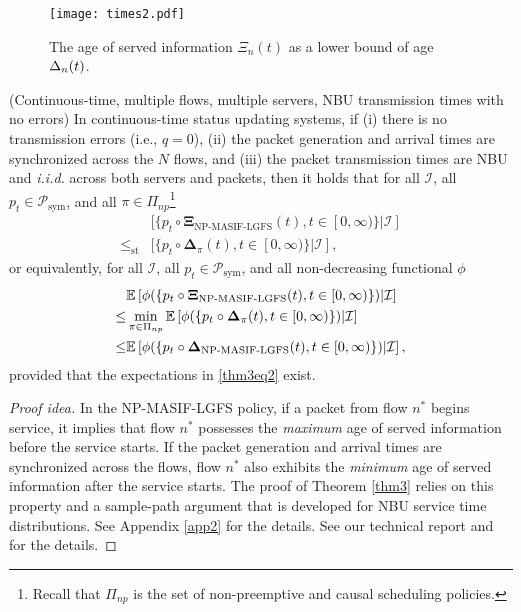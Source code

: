\begin{figure}
\centering 
\texttt{[image: times2.pdf]} \caption{The age of served information $\Xi_{n} (t)$ as a lower bound of  age $\Delta_{n}(t)$.}
\vspace{-5mm}
\label{fig_times2} 
\end{figure} 

\begin{theorem}(Continuous-time, multiple flows, multiple servers, NBU transmission times with no errors) \label{thm3}
In continuous-time status updating systems, if  (i) there is no  transmission errors (i.e., $q=0$),  (ii) the packet generation and arrival times are {synchronized} across the $N$ flows,  and (iii) the packet transmission times are NBU and \emph{i.i.d.} across both servers and packets, then it holds that for all $\mathcal{I}$, all $p_t \in\mathcal{P}_{\text{sym}}$, and all $\pi\in\Pi_{np}$\footnote{Recall that $\Pi_{np}$ is the set of non-preemptive and causal scheduling policies.} 
\begin{align}\label{thm3eq1}
&[\{p_t \circ\bm{\Xi}_{\text{NP-MASIF-LGFS}}(t), t\in [0,\infty)\}\vert\mathcal{I}] \nonumber\\
\leq_{\text{st}} & [\{p_t \circ\bm{\Delta}_\pi(t), t\in [0,\infty)\}\vert\mathcal{I}],
\end{align}
or equivalently, for all $\mathcal{I}$, all $p_t \in\mathcal{P}_{\text{sym}}$, and all non-decreasing functional $\phi$
 \begin{align}\label{thm3eq2}
&\mathbb{E}\left[\phi (\{p_t \circ\bm{\Xi}_{\text{NP-MASIF-LGFS}}(t),t\in [0,\infty)\})\vert\mathcal{I}\right] \nonumber\\
\leq & \min_{\pi\in\Pi_{np}} \mathbb{E}\left[\phi (\{p_t \circ\bm{\Delta}_\pi(t),t\in [0,\infty)\})\vert\mathcal{I}\right] \nonumber\\
\leq & \mathbb{E}\left[\phi (\{p_t \circ\bm{\Delta}_{\text{NP-MASIF-LGFS}}(t),t\in [0,\infty)\})\vert\mathcal{I}\right],
\end{align}
provided that the expectations in \eqref{thm3eq2} exist.
\end{theorem}

\begin{proof}[Proof idea]
In the NP-MASIF-LGFS policy, if a packet from flow $n^*$ begins service, it implies that flow $n^*$ possesses the \emph{maximum} age of served information before the service starts. If the packet generation and arrival times are synchronized across the flows, flow $n^*$ also exhibits the \emph{minimum} age of served information after the service starts. The proof of Theorem \ref{thm3} relies on this property and a sample-path argument that is developed for NBU service time distributions. %
\ifreport
See Appendix \ref{app2} for the details.
\else
See our technical report \cite{SunMultiFlow18} and \cite{sun2016delay,sun2017delay} for the details.
\fi
\end{proof}

